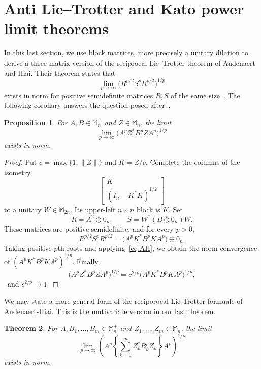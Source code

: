 \documentclass[11pt]{amsart}
\numberwithin{equation}{section}
\newtheorem{theorem}{Theorem}[section]
\newtheorem{proposition}[theorem]{Proposition}
\newcommand{\Mn}{\mathbb M_n}
\newcommand{\Mnp}{\mathbb M_n^+}
\newcommand{\norm}[1]{\lVert #1\rVert}
\begin{document}
\section{\texorpdfstring{Anti Lie--Trotter and Kato power limit theorems}{Anti Lie--Trotter and Kato power limit theorems}}
\label{sec:limit}

In this last section, we use
 \begingroup
block matrices, more precisely
\endgroup
 a unitary dilation to derive a three-matrix version of the
reciprocal Lie--Trotter theorem of Audenaert and Hiai. Their theorem states that
\begin{equation}\label{eq:AH}
 \lim_{p\to\infty}\bigl(R^{p/2}S^pR^{p/2}\bigr)^{1/p}
\end{equation}
exists in norm for positive semidefinite matrices $R,S$ of the same size~\cite[Theorem~2.5]{AudenaertHiai}. The following corollary answers the question posed
after~\cite[Corollary~2.6]{BourinLee2016}.

\begin{proposition}\label{prop:matrix-limit}
For $A,B\in\Mnp$ and $Z\in\Mn$, the limit
\begin{equation}\label{eq:power-limit}
 \lim_{p\to\infty}\bigl(A^pZ^*B^pZA^p\bigr)^{1/p}
\end{equation}
exists in norm.
\end{proposition}

\begin{proof}
Put $c=\max\{1,\norm{Z}\}$ and $K=Z/c$. Complete the columns of the isometry
\[
 \begin{bmatrix}K\\(I_n-K^*K)^{1/2}\end{bmatrix}
\]
to a unitary $W\in\mathbb M_{2n}$. Its upper-left $n\times n$ block is $K$. Set
\[
 R=A^2\oplus0_n,
 \qquad
 S=W^*(B\oplus0_n)W.
\]
These matrices are positive semidefinite, and for every $p>0$,
\[
 R^{p/2}S^pR^{p/2}
 =\bigl(A^pK^*B^pKA^p\bigr)\oplus0_n.
\]
Taking positive $p$th roots and applying~\eqref{eq:AH}, we obtain the norm convergence of $(A^pK^*B^pKA^p)^{1/p}$. Finally,
\[
 \bigl(A^pZ^*B^pZA^p\bigr)^{1/p}
 =c^{2/p}\bigl(A^pK^*B^pKA^p\bigr)^{1/p},
\]
~and $c^{2/p}\to1$.
\end{proof}




\begingroup

We may state a more general form of the reciporocal Lie-Trotter formuale of Audenaert-Hiai. This is the mutivariate version in our last theorem.

\begin{theorem}\label{thm:matrix-limit}
For $A,B_1,\ldots,B_m\in\Mnp$ and $Z_1,\ldots,Z_m\in\Mn$, the limit
\begin{equation}\label{eq:sum-power-limit}
 \lim_{p\to\infty}\left(A^p\left\{\sum_{k=1}^mZ_k^*B_k^pZ_k\right\}A^p\right)^{1/p}
\end{equation}
exists in norm.
\end{theorem}
\end{document}
